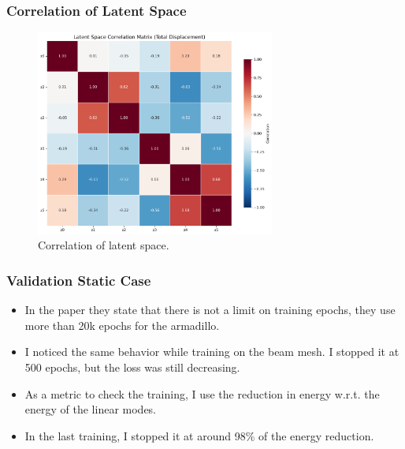 \documentclass{beamer}
\begin{document}
\begin{frame}
    \frametitle{Correlation of Latent Space}
    
    \begin{figure}
        \centering
        \includegraphics[width=0.7\textwidth]{Images/latent_correlations_total_total.png}
        \caption{Correlation of latent space.}
        \label{fig:latent_correlation}

    \end{figure}
\end{frame}




\begin{frame}
    \frametitle{Validation Static Case}
    \begin{itemize}
        \item In the paper they state that there is not a limit on training epochs, they use more than 20k epochs for the armadillo.
        \item I noticed the same behavior while training on the beam mesh. I stopped it at 500 epochs, but the loss was still decreasing. 
        \item As a metric to check the training, I use the reduction in energy w.r.t. the energy of the linear modes.
        \item In the last training, I stopped it at around 98\% of the energy reduction.
    \end{itemize}
\end{frame}
\end{document}
